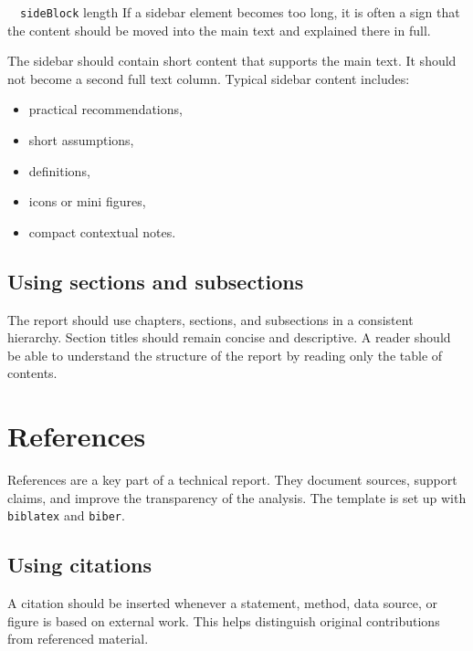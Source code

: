 \documentclass[11pt,a4paper]{report}
\begin{document}
\begin{sideBlock}[yellow]{~~\texttt{sideBlock} length}
If a sidebar element becomes too long, it is often a sign that the content should be moved into the main text and explained there in full.
\end{sideBlock}

The sidebar should contain short content that supports the main text. It should not become a second full text column. Typical sidebar content includes:
\begin{itemize}
    \item practical recommendations,
    \item short assumptions,
    \item definitions,
    \item icons or mini figures,
    \item compact contextual notes.
\end{itemize}

\section{Using sections and subsections}

The report should use chapters, sections, and subsections in a consistent hierarchy. Section titles should remain concise and descriptive. A reader should be able to understand the structure of the report by reading only the table of contents.

\clearpage

\chapter{References}
References are a key part of a technical report. They document sources, support claims, and improve the transparency of the analysis. The template is set up with \texttt{biblatex} and \texttt{biber}.

\section{Using citations}

A citation should be inserted whenever a statement, method, data source, or figure is based on external work. This helps distinguish original contributions from referenced material.
\end{document}
